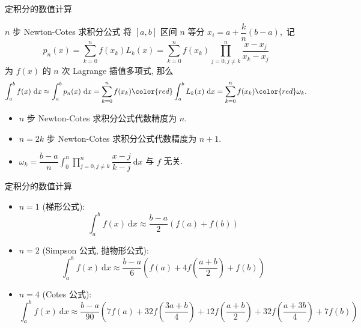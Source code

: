 
\begin{frame}{定积分的数值计算}

\begin{block}{$n$ 步 Newton-Cotes 求积分公式}
将 $[a, b]$ 区间 $n$ 等分 $x_i = a + \dfrac{k}{n}(b-a),$ 记
\[p_n(x) = \sum\limits_{k=0}^n f(x_k) L_k(x) = \sum\limits_{k=0}^n f(x_k) \prod\limits_{j=0, j\neq k}^n \dfrac{x-x_j}{x_k-x_j}\]
为 $f(x)$ 的 $n$ 次 Lagrange 插值多项式, 那么
\[\int_a^b f(x) ~ \mathrm{d} x \approx \int_a^b p_n(x) ~ \mathrm{d} x = \sum\limits_{k=0}^n f(x_k) {\color{red}\int_a^b L_k(x) ~ \mathrm{d} x} = \sum\limits_{k=0}^n f(x_k) {\color{red}\omega_k}.\]
\end{block}

\pause

\begin{itemize}
\item $n$ 步 Newton-Cotes 求积分公式代数精度为 $n.$
\item $n=2k$ 步 Newton-Cotes 求积分公式代数精度为 $n+1.$
\item $\omega_k = \dfrac{b-a}{n} \int_0^n \prod\limits_{j=0, j\neq k}^n \dfrac{x-j}{k-j} ~ \mathrm{d} x$ 与 $f$ 无关.
\end{itemize}

\end{frame}


\begin{frame}{定积分的数值计算}

\begin{itemize}[<+->]
\item $n = 1$ (梯形公式):
\[\int_a^b f(x) ~ \mathrm{d} x \approx \dfrac{b-a}{2} \left( f(a) + f(b) \right)\]
\item $n = 2$ (Simpson 公式, 抛物形公式):
\[\int_a^b f(x) ~ \mathrm{d} x \approx \dfrac{b-a}{6} \left( f(a) + 4f\left( \dfrac{a+b}{2} \right) + f(b) \right)\]
\item $n = 4$ (Cotes 公式):
\[
\int_a^b f(x) ~ \mathrm{d} x \approx \dfrac{b-a}{90} \left( 7f(a) + 32f\left( \dfrac{3a+b}{4} \right) + 12f\left( \dfrac{a+b}{2} \right) + 32f\left( \dfrac{a+3b}{4} \right) + 7f(b) \right)
\]
\end{itemize}

\end{frame}


